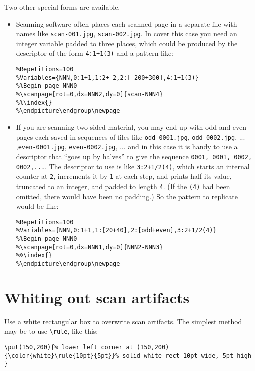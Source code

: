 \documentclass[11pt]{article}
\begin{document}
Two other special forms are available. 
\begin{itemize}
\item
Scanning software often places each scanned page in a separate file with names like {\tt scan-001.jpg}, {\tt scan-002.jpg}. In cover this case you need an integer variable padded to three places, which could be produced by the descriptor of the form {\tt 4:1+1(3)} and a pattern like:
\begin{verbatim}
%Repetitions=100
%Variables={NNN,0:1+1,1:2+-2,2:[-200+300],4:1+1(3)}
%%Begin page NNN0
%\scanpage[rot=0,dx=NNN2,dy=0]{scan-NNN4}
%%\index{}
%\endpicture\endgroup\newpage
\end{verbatim}
\item If you are scanning two-sided material, you may end up with odd and even pages each saved in sequences of files like {\tt odd-0001.jpg}, {\tt odd-0002.jpg}, ... ,{\tt even-0001.jpg}, {\tt even-0002.jpg}, ... and in this case it is handy to use a descriptor that ``goes up by halves'' to give the sequence {\tt 0001, 0001, 0002, 0002,...}. The descriptor to use is like {\tt 3:2+1/2(4)}, which starts an internal counter at {\tt 2}, increments it by {\tt1} at each step, and prints half its value, truncated to an integer, and padded to length {\tt 4}. (If the {\tt(4)} had been omitted, there would have been no padding.) So the pattern to replicate would be like:
\begin{verbatim}
%Repetitions=100
%Variables={NNN,0:1+1,1:[20+40],2:[odd+even],3:2+1/2(4)}
%%Begin page NNN0
%\scanpage[rot=0,dx=NNN1,dy=0]{NNN2-NNN3}
%%\index{}
%\endpicture\endgroup\newpage
\end{verbatim}
\end{itemize}
\section{Whiting out scan artifacts}
Use a white rectangular box to overwrite scan artifacts. The simplest method may  be to use \verb|\rule|, like this:
\begin{verbatim}
\put(150,200){% lower left corner at (150,200)
{\color{white}\rule{10pt}{5pt}}% solid white rect 10pt wide, 5pt high
} 
\end{verbatim}
\end{document}
